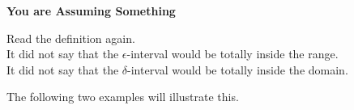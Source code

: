 \documentclass{ximera}
\begin{document}
\begin{warning} \textbf{\textcolor{red!70!black}{You are Assuming Something}}

Read the definition again. \\

It did not say that the $\epsilon$-interval would be totally inside the range. \\

It did not say that the $\delta$-interval would be totally inside the domain. \\

\end{warning}


The following two examples will illustrate this.
\end{document}
